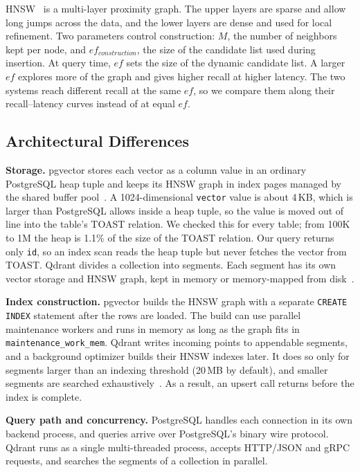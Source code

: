 \documentclass[sigconf, nonacm]{acmart}
\begin{document}
HNSW~\cite{malkov2018} is a multi-layer proximity graph. The upper layers are sparse
and allow long jumps across the data, and the lower layers are dense and used for local
refinement. Two parameters control construction: $M$, the number of neighbors kept per
node, and $ef_{construction}$, the size of the candidate list used during insertion.
At query time, $ef$ sets the size of the dynamic candidate list. A larger $ef$ explores
more of the graph and gives higher recall at higher latency. The two systems reach
different recall at the same $ef$, so we compare them along their recall--latency curves
instead of at equal $ef$.

\subsection{Architectural Differences}

\textbf{Storage.} pgvector stores each vector as a column value in an ordinary
PostgreSQL heap tuple and keeps its HNSW graph in index pages managed by the shared
buffer pool~\cite{pgvector,postgres_docs}. A 1024-dimensional \texttt{vector} value is
about 4\,KB, which is larger than PostgreSQL allows inside a heap tuple, so the value is
moved out of line into the table's TOAST relation. We checked this for every table; from
100K to 1M the heap is 1.1\% of the size of the TOAST relation. Our query returns only
\texttt{id}, so an index scan reads the heap tuple but never fetches the vector from
TOAST. Qdrant divides a collection into segments. Each segment has its own vector
storage and HNSW graph, kept in memory or memory-mapped from disk~\cite{qdrant}.

\textbf{Index construction.} pgvector builds the HNSW graph with a separate
\texttt{CREATE INDEX} statement after the rows are loaded. The build can use parallel
maintenance workers and runs in memory as long as the graph fits in
\texttt{maintenance\_work\_mem}. Qdrant writes incoming points to appendable segments,
and a background optimizer builds their HNSW indexes later. It does so only for
segments larger than an indexing threshold (20\,MB by default), and smaller segments
are searched exhaustively~\cite{qdrant}. As a result, an upsert call returns before the
index is complete.

\textbf{Query path and concurrency.} PostgreSQL handles each connection in its own
backend process, and queries arrive over PostgreSQL's binary wire protocol. Qdrant runs
as a single multi-threaded process, accepts HTTP/JSON and gRPC requests, and searches the
segments of a collection in parallel.
\end{document}
